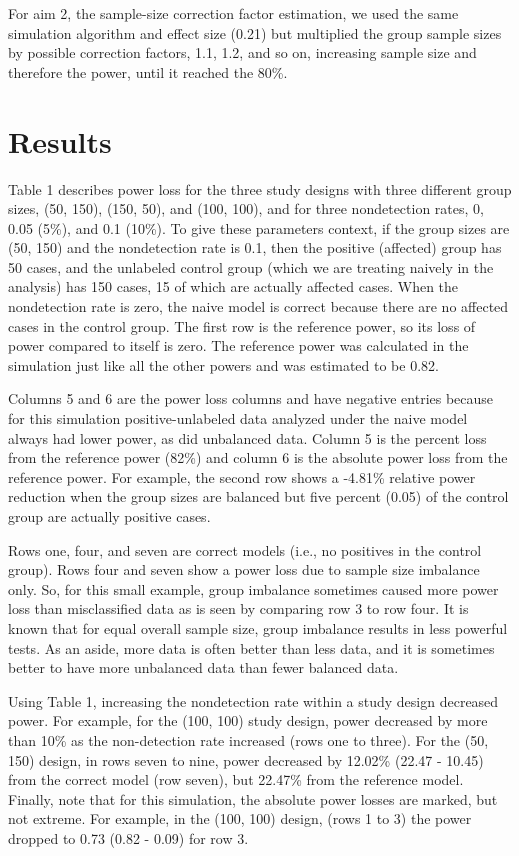 \documentclass[
]{article}
\begin{document}
For aim 2, the sample-size correction factor estimation, we used the
same simulation algorithm and effect size (0.21) but multiplied the
group sample sizes by possible correction factors, 1.1, 1.2, and so on,
increasing sample size and therefore the power, until it reached the
80\%.

\hypertarget{results-1}{%
\section{Results}\label{results-1}}

Table 1 describes power loss for the three study designs with three
different group sizes, (50, 150), (150, 50), and (100, 100), and for
three nondetection rates, 0, 0.05 (5\%), and 0.1 (10\%). To give these
parameters context, if the group sizes are (50, 150) and the
nondetection rate is 0.1, then the positive (affected) group has 50
cases, and the unlabeled control group (which we are treating naively in
the analysis) has 150 cases, 15 of which are actually affected cases.
When the nondetection rate is zero, the naive model is correct because
there are no affected cases in the control group. The first row is the
reference power, so its loss of power compared to itself is zero. The
reference power was calculated in the simulation just like all the other
powers and was estimated to be 0.82.

Columns 5 and 6 are the power loss columns and have negative entries
because for this simulation positive-unlabeled data analyzed under the
naive model always had lower power, as did unbalanced data. Column 5 is
the percent loss from the reference power (82\%) and column 6 is the
absolute power loss from the reference power. For example, the second
row shows a -4.81\% relative power reduction when the group sizes are
balanced but five percent (0.05) of the control group are actually
positive cases.

Rows one, four, and seven are correct models (i.e., no positives in the
control group). Rows four and seven show a power loss due to sample size
imbalance only. So, for this small example, group imbalance sometimes
caused more power loss than misclassified data as is seen by comparing
row 3 to row four. It is known that for equal overall sample size, group
imbalance results in less powerful tests. As an aside, more data is
often better than less data, and it is sometimes better to have more
unbalanced data than fewer balanced data.

Using Table 1, increasing the nondetection rate within a study design
decreased power. For example, for the (100, 100) study design, power
decreased by more than 10\% as the non-detection rate increased (rows
one to three). For the (50, 150) design, in rows seven to nine, power
decreased by 12.02\% (22.47 - 10.45) from the correct model (row seven),
but 22.47\% from the reference model. Finally, note that for this
simulation, the absolute power losses are marked, but not extreme. For
example, in the (100, 100) design, (rows 1 to 3) the power dropped to
0.73 (0.82 - 0.09) for row 3.
\end{document}
